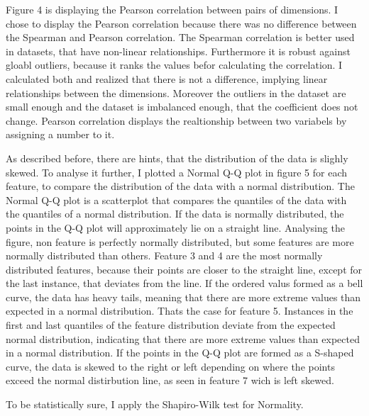 Figure 4 is displaying the Pearson correlation between pairs of dimensions.
I chose to display the Pearson correlation because there was no difference between the Spearman and Pearson correlation.
The Spearman correlation is better used in datasets, that have non-linear relationships.
Furthermore it is robust against gloabl outliers, because it ranks the values befor calculating the correlation. 
I calculated both and realized that there is not a difference, implying linear relationships between the dimensions.
Moreover the outliers in the dataset are small enough and the dataset is imbalanced enough, that the coefficient does not change. 
Pearson correlation displays the realtionship between two variabels by assigning a number to it.


As described before, there are hints, that the distribution of the data is slighly skewed. 
To analyse it further, I plotted a Normal Q-Q plot in figure 5 for each feature, to compare the distribution of the data with a normal distribution.
The Normal Q-Q plot is a scatterplot that compares the quantiles of the data with the quantiles of a normal distribution.
If the data is normally distributed, the points in the Q-Q plot will approximately lie on a straight line.
Analysing the figure, non feature is perfectly normally distributed, but some features are more normally distributed than others.
Feature 3 and 4 are the most normally distributed features, because their points are closer to the straight line, except for the last instance, that deviates from the line.
If the ordered valus formed as a bell curve, the data has heavy tails, meaning that there are more extreme values than expected in a normal distribution.
Thats the case for feature 5.
Instances in the first and last quantiles of the feature distribution deviate from the expected normal distribution, indicating that there are more extreme values than expected in a normal distribution.
If the points in the Q-Q plot are formed as a S-shaped curve, the data is skewed to the right or left depending on where the points exceed the normal distirbution line, as seen in feature 7 wich is left skewed.




To be statistically sure, I apply the Shapiro-Wilk test for Normality.

